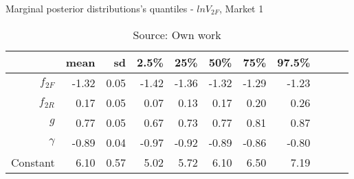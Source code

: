 \begin{table}[H]
\caption{Marginal posterior distributions's quantiles - $ln V_{2F}$,  Market 1}
\centering
\begin{tabular}{rrrrrrrrrrr}
  \toprule
            & mean  & sd   & 2.5\% & 25\%  & 50\%  & 75\%  & 97.5\%\\
  \hline
  $f_{2F}$  & -1.32 & 0.05 & -1.42 & -1.36 & -1.32 & -1.29 & -1.23 \\
  $f_{2R}$  & 0.17  & 0.05 & 0.07  & 0.13  & 0.17  & 0.20  & 0.26  \\
  $g$       & 0.77  & 0.05 & 0.67  & 0.73  & 0.77  & 0.81  & 0.87  \\
  $\gamma$  & -0.89 & 0.04 & -0.97 & -0.92 & -0.89 & -0.86 & -0.80 \\
  Constant  & 6.10  & 0.57 & 5.02  & 5.72  & 6.10  & 6.50  & 7.19  \\
     \bottomrule
\end{tabular}
\caption*{Source: Own work}
\end{table}
